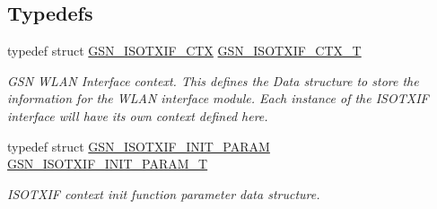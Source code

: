 \subsection*{Typedefs}
\begin{DoxyCompactItemize}
\item 
typedef struct \hyperlink{a00105}{GSN\_\-ISOTXIF\_\-CTX} \hyperlink{a00625_ga35f27a7ee5e85ca8decc1f1636e8ca08}{GSN\_\-ISOTXIF\_\-CTX\_\-T}
\begin{DoxyCompactList}\small\item\em GSN WLAN Interface context. This defines the Data structure to store the information for the WLAN interface module. Each instance of the ISOTXIF interface will have its own context defined here. \end{DoxyCompactList}\item 
typedef struct \hyperlink{a00106}{GSN\_\-ISOTXIF\_\-INIT\_\-PARAM} \hyperlink{a00625_ga86fe1e652bfee5af4919a3021fa448fc}{GSN\_\-ISOTXIF\_\-INIT\_\-PARAM\_\-T}
\begin{DoxyCompactList}\small\item\em ISOTXIF context init function parameter data structure. \end{DoxyCompactList}\end{DoxyCompactItemize}
